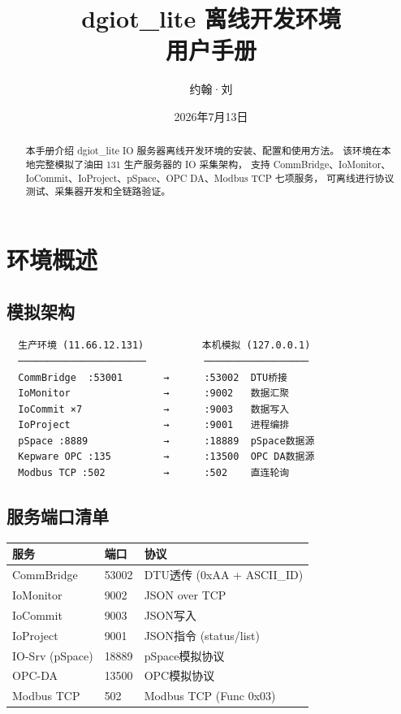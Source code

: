 \documentclass[12pt,a4paper]{ctexart}
\title{\textbf{dgiot\_lite 离线开发环境\\用户手册}}
\author{约翰·刘}
\date{2026年7月13日}
\begin{document}
\maketitle
\begin{abstract}
本手册介绍 dgiot\_lite IO 服务器离线开发环境的安装、配置和使用方法。
该环境在本地完整模拟了油田 131 生产服务器的 IO 采集架构，
支持 CommBridge、IoMonitor、IoCommit、IoProject、pSpace、OPC DA、Modbus TCP 七项服务，
可离线进行协议测试、采集器开发和全链路验证。
\end{abstract}

\section{环境概述}

\subsection{模拟架构}
\begin{verbatim}
  生产环境 (11.66.12.131)          本机模拟 (127.0.0.1)
  ──────────────────────          ──────────────────
  CommBridge  :53001       →      :53002  DTU桥接
  IoMonitor                →      :9002   数据汇聚
  IoCommit ×7              →      :9003   数据写入
  IoProject                →      :9001   进程编排
  pSpace :8889             →      :18889  pSpace数据源
  Kepware OPC :135         →      :13500  OPC DA数据源
  Modbus TCP :502          →      :502    直连轮询
\end{verbatim}

\subsection{服务端口清单}
\begin{table}[H]\centering
\begin{tabular}{lll}
\toprule
\textbf{服务} & \textbf{端口} & \textbf{协议} \\
\midrule
CommBridge & 53002 & DTU透传 (0xAA + ASCII\_ID) \\
IoMonitor & 9002 & JSON over TCP \\
IoCommit & 9003 & JSON写入 \\
IoProject & 9001 & JSON指令 (status/list) \\
IO-Srv (pSpace) & 18889 & pSpace模拟协议 \\
OPC-DA & 13500 & OPC模拟协议 \\
Modbus TCP & 502 & Modbus TCP (Func 0x03) \\
\bottomrule
\end{tabular}
\end{table}
\end{document}
